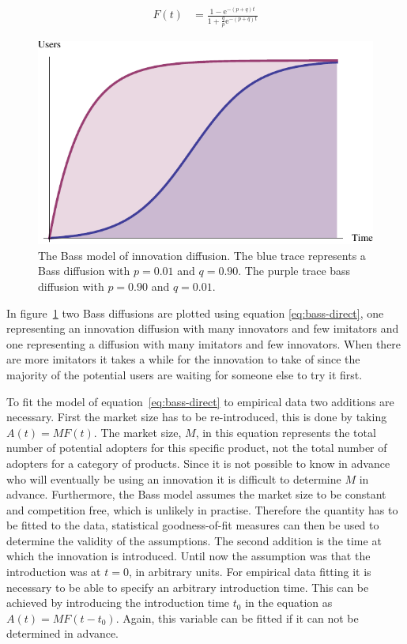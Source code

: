 \documentclass[smallextended,final]{svjour3}
\newcommand{\e}{\mathrm{e}}
\begin{document}
\begin{align}\label{eq:bass-direct}
F(t) &= \frac{1 - \e^{-(p+q)t}}{1+\frac{q}{p}\e^{-(p+q)t}}
\end{align}

\begin{figure}\small\centering
\caption[Bass model of innovation diffusion]{The Bass model of innovation diffusion. The blue trace represents a Bass diffusion with $p=0.01$ and $q=0.90$. The purple trace bass diffusion with $p=0.90$ and $q=0.01$.}
\label{fig:bass}
\includegraphics{Bass.pdf}
\end{figure}

In figure~\ref{fig:bass} two Bass diffusions are plotted using equation \eqref{eq:bass-direct}, one representing an innovation diffusion with many innovators and few imitators and one representing a diffusion with many imitators and few innovators. When there are more imitators it takes a while for the innovation to take of since the majority of the potential users are waiting for someone else to try it first.

To fit the model of equation~\eqref{eq:bass-direct} to empirical data two additions are necessary. First the market size has to be re-introduced, this is done by taking $A(t) = M F(t)$. The market size, $M$, in this equation represents the total number of potential adopters for this specific product, not the total number of adopters for a category of products. Since it is not possible to know in advance who will eventually be using an innovation it is difficult to determine $M$ in advance. Furthermore, the Bass model assumes the market size to be constant and competition free, which is unlikely in practise. Therefore the quantity has to be fitted to the data, statistical goodness-of-fit measures can then be used to determine the validity of the assumptions. The second addition is the time at which the innovation is introduced. Until now the assumption was that the introduction was at $t=0$, in arbitrary units. For empirical data fitting it is necessary to be able to specify an arbitrary introduction time. This can be achieved by introducing the introduction time $t_0$ in the equation as $A(t) = M F(t - t_0)$. Again, this variable can be fitted if it can not be determined in advance.
\end{document}
